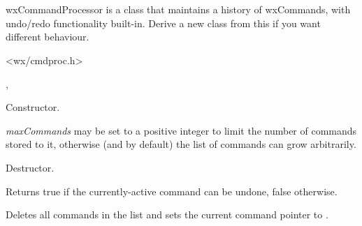 \section{}\label{wxcommandprocessor}

wxCommandProcessor is a class that maintains a history of wxCommands,
with undo/redo functionality built-in. Derive a new class from this
if you want different behaviour.




<wx/cmdproc.h>


, 



\label{wxcommandprocessorctor}


Constructor.

{\it maxCommands} may be set to a positive integer to limit the number of
commands stored to it, otherwise (and by default) the list of commands can grow
arbitrarily.


\label{wxcommandprocessordtor}


Destructor.


\label{wxcommandprocessorcanundo}


Returns true if the currently-active command can be undone, false otherwise.


\label{wxcommandprocessorclearcommands}


Deletes all commands in the list and sets the current command pointer to \NULL.


\label{wxcommandprocessorredo}


